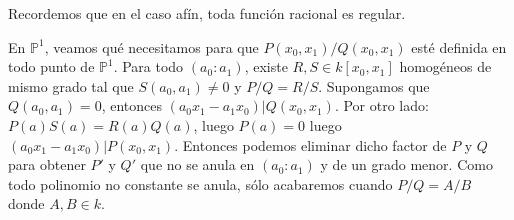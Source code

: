 \documentclass[ACGA.tex]{subfiles}
\begin{document}
\begin{nota}
Recordemos que en el caso afín, toda función racional es regular.
\end{nota}

\begin{ej}
En $\mathbb{P}^1$, veamos qué necesitamos para que $P(x_0,x_1)/Q(x_0,x_1)$ esté definida en todo punto de $\mathbb{P}^1$. Para todo $(a_0:a_1)$, existe $R,S \in k[x_0,x_1]$ homogéneos de mismo grado tal que $S(a_0,a_1)\neq 0$ y $P/Q=R/S$. Supongamos que $Q(a_0,a_1)=0$, entonces $(a_0x_1-a_1x_0) | Q(x_0,x_1)$. Por otro lado: $P(a)S(a)=R(a)Q(a)$, luego $P(a)=0$ luego $(a_0x_1-a_1x_0) | P(x_0,x_1)$. Entonces podemos eliminar dicho factor de $P$ y $Q$ para obtener $P'$ y $Q'$ que no se anula en $(a_0:a_1)$ y de un grado menor. Como todo polinomio no constante se anula, sólo acabaremos cuando $P/Q=A/B$ donde $A,B \in k$. 
\end{ej}
\end{document}
